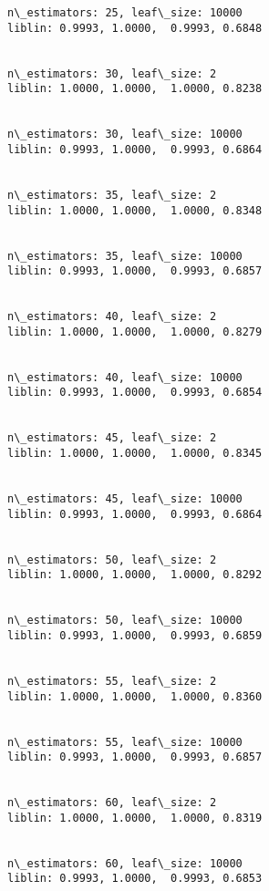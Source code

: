 \documentclass[10pt, t]{beamer}
\begin{document}
    \begin{Verbatim}[commandchars=\\\{\}]
n\_estimators: 25, leaf\_size: 10000
liblin: 0.9993, 1.0000,  0.9993, 0.6848 


n\_estimators: 30, leaf\_size: 2
liblin: 1.0000, 1.0000,  1.0000, 0.8238 


n\_estimators: 30, leaf\_size: 10000
liblin: 0.9993, 1.0000,  0.9993, 0.6864 


n\_estimators: 35, leaf\_size: 2
liblin: 1.0000, 1.0000,  1.0000, 0.8348 


n\_estimators: 35, leaf\_size: 10000
liblin: 0.9993, 1.0000,  0.9993, 0.6857 


n\_estimators: 40, leaf\_size: 2
liblin: 1.0000, 1.0000,  1.0000, 0.8279 


n\_estimators: 40, leaf\_size: 10000
liblin: 0.9993, 1.0000,  0.9993, 0.6854 


n\_estimators: 45, leaf\_size: 2
liblin: 1.0000, 1.0000,  1.0000, 0.8345 


n\_estimators: 45, leaf\_size: 10000
liblin: 0.9993, 1.0000,  0.9993, 0.6864 


n\_estimators: 50, leaf\_size: 2
liblin: 1.0000, 1.0000,  1.0000, 0.8292 


n\_estimators: 50, leaf\_size: 10000
liblin: 0.9993, 1.0000,  0.9993, 0.6859 


n\_estimators: 55, leaf\_size: 2
liblin: 1.0000, 1.0000,  1.0000, 0.8360 


n\_estimators: 55, leaf\_size: 10000
liblin: 0.9993, 1.0000,  0.9993, 0.6857 


n\_estimators: 60, leaf\_size: 2
liblin: 1.0000, 1.0000,  1.0000, 0.8319 


n\_estimators: 60, leaf\_size: 10000
liblin: 0.9993, 1.0000,  0.9993, 0.6853 



    \end{Verbatim}
\end{document}
